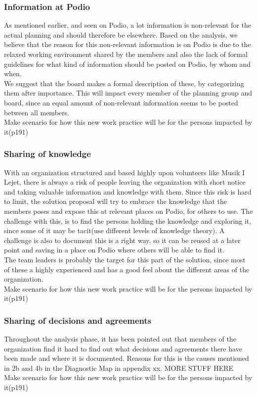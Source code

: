 \subsubsection{Information at Podio}
As mentioned earlier, and seen on Podio, a lot information is non-relevant for the actual planning and should therefore be elsewhere. Based on the analysis, we believe that the reason for this non-relevant information is on Podio is due to the relaxed working environment shared by the members and also the lack of formal guidelines for what kind of information should be posted on Podio, by whom and when.\\ 
We suggest that the board makes a formal description of these, by categorizing them after importance.
This will impact every member of the planning group and board, since an equal amount of non-relevant information seems to be posted between all members. \\

Make scenario for how this new work practice will be for the persons impacted by it(p191)
  
\subsubsection{Sharing of knowledge}
With an organization structured and based highly upon volunteers like Musik I Lejet, there is always a risk of people leaving the organization with short notice and taking valuable information and knowledge with them. Since this risk is hard to limit, the solution proposal will try to embrace the knowledge that the members poses and expose this at relevant places on Podio, for others to use. The challenge with this, is to find the persons holding the knowledge and exploring it, since some of it may be tacit(use different levels of knowledge theory). A challenge is also to document this is a right way, so it can be reused at a later point and saving in a place on Podio where others will be able to find it.\\
The team leaders is probably the target for this part of the solution, since most of these a highly experienced and has a good feel about the different areas of the organization.\\

Make scenario for how this new work practice will be for the persons impacted by it(p191)

\subsubsection{Sharing of decisions and agreements}
Throughout the analysis phase, it has been pointed out that members of the organization find it hard to find out what decisions and agreements there have been made and where it is documented. Reasons for this is the causes mentioned in 2b and 4b in the Diagnostic Map in appendix xx. MORE STUFF HERE\\ 
Make scenario for how this new work practice will be for the persons impacted by it(p191)

